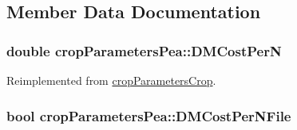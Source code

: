 \subsection{Member Data Documentation}
\hypertarget{classcrop_parameters_pea_a672aa866e5e83329bf1d7043eeb959cd}{
\subsubsection[{DMCostPerN}]{\setlength{\rightskip}{0pt plus 5cm}double {\bf cropParametersPea::DMCostPerN}}}
\label{classcrop_parameters_pea_a672aa866e5e83329bf1d7043eeb959cd}


Reimplemented from \hyperlink{classcrop_parameters_crop_ac22d342576a5f3f5f769dd1dedaaa391}{cropParametersCrop}.\hypertarget{classcrop_parameters_pea_a9c85f8f0711af306a638f8fb81bb94a8}{
\subsubsection[{DMCostPerNFile}]{\setlength{\rightskip}{0pt plus 5cm}bool {\bf cropParametersPea::DMCostPerNFile}}}
\label{classcrop_parameters_pea_a9c85f8f0711af306a638f8fb81bb94a8}


